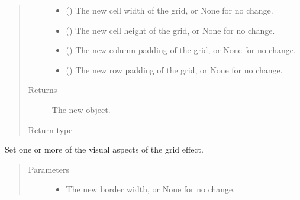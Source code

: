 \documentclass[letterpaper,10pt,english,openany,oneside]{sphinxmanual}
\begin{document}
\begin{fulllineitems}
\begin{fulllineitems}
\begin{quote}
\begin{description}
\begin{itemize}
\item {} 
 () \textendash{} The new cell width of the grid, or None for no change.

\item {} 
 () \textendash{} The new cell height of the grid, or None for no change.

\item {} 
 () \textendash{} The new column padding of the grid, or None for no change.

\item {} 
 () \textendash{} The new row padding of the grid, or None for no change.

\end{itemize}

\item[{Returns}] \leavevmode
The new  object.

\item[{Return type}] \leavevmode
{\hyperref[\detokenize{api:spookyconsole.gui.core.GridGeometry}]{}}

\end{description}\end{quote}

\end{fulllineitems}


\begin{fulllineitems}
\label{\detokenize{api:spookyconsole.gui.core.Grid.set_grid_visual}}
Set one or more of the visual aspects of the grid effect.
\begin{quote}\begin{description}
\item[{Parameters}] \leavevmode\begin{itemize}
\item {} 
 \textendash{} The new border width, or None for no change.


\end{itemize}
\end{description}
\end{quote}
\end{fulllineitems}
\end{fulllineitems}
\end{document}

